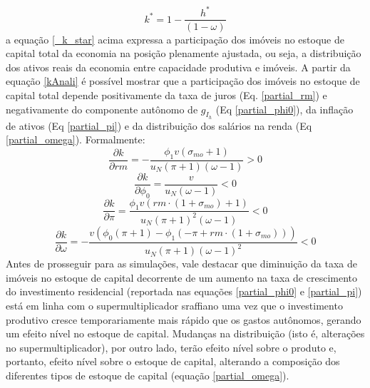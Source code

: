 \begin{equation}
\label{_k_star}
k^* = 1 - \frac{h^*}{(1 - \omega)}
\end{equation}
a equação \ref{_k_star} acima expressa a participação dos imóveis no estoque de capital total da economia na posição plenamente ajustada, ou seja, a distribuição dos ativos reais da economia entre capacidade produtiva e imóveis. 
A partir da equação \ref{kAnali} é possível mostrar que a participação dos imóveis no estoque de capital total depende 
positivamente da taxa de juros (Eq. \ref{partial_rm}) e 
negativamente do componente autônomo de $g_{I_h}$ (Eq \ref{partial_phi0}), da inflação de ativos (Eq \ref{partial_pi}) e da distribuição dos salários na renda (Eq \ref{partial_omega}). Formalmente:
\begin{equation}
\label{partial_rm}
\frac{\partial k}{\partial rm} = - \frac{\phi_{1} v \left(\sigma_{mo} + 1\right)}{u_N \left(\pi + 1\right) \left(\omega - 1\right)} > 0
\end{equation}
\begin{equation}
\label{partial_phi0}
\frac{\partial k}{\partial \phi_0} = \frac{v}{u_N \left(\omega - 1\right)} < 0
\end{equation}
\begin{equation}
\label{partial_pi}
\frac{\partial k}{\partial \pi} = \frac{\phi_{1} v \left(rm\cdot(1+\sigma_{mo}) + 1\right)}{u_N \left(\pi + 1\right)^{2} \left(\omega - 1\right)} < 0
\end{equation}
\begin{equation}
\label{partial_omega}
\frac{\partial k}{\partial \omega} = - \frac{v \left(\phi_{0} \left(\pi + 1\right) - \phi_{1} \left(- \pi + rm\cdot(1 + \sigma_{mo})\right)\right)}{u_N \left(\pi + 1\right) \left(\omega - 1\right)^{2}} < 0
\end{equation}
Antes de prosseguir para as simulações, vale destacar que diminuição da taxa de imóveis no estoque de capital decorrente de um aumento na taxa de crescimento do investimento residencial (reportada nas equações \ref{partial_phi0} e \ref{partial_pi}) está em linha com o supermultiplicador sraffiano uma vez que o
investimento produtivo cresce temporariamente mais rápido que os gastos autônomos, gerando um efeito nível no estoque de capital.
Mudanças na distribuição (isto é, alterações no supermultiplicador), por outro lado, 
terão efeito nível sobre o produto e, portanto, efeito nível sobre o estoque de capital, alterando a composição dos diferentes tipos de estoque de capital (equação \ref{partial_omega}). 


